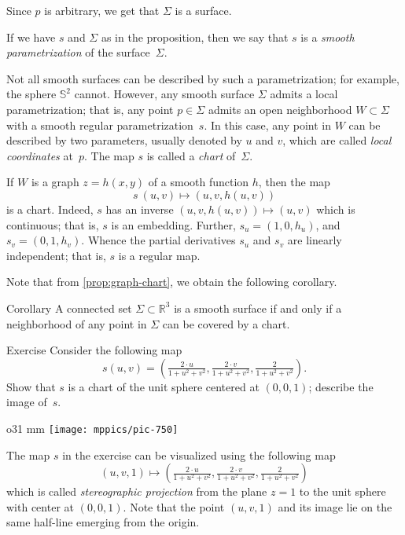 Since $p$ is arbitrary, we get that $\Sigma$ is a surface.
\qeds

If we have $s$ and $\Sigma$ as in the proposition, then we say that $s$ is a \emph{smooth parametrization} of the surface~$\Sigma$. 

Not all smooth surfaces can be described by such a parametrization;
for example, the sphere $\mathbb{S}^2$ cannot.
However, any smooth surface $\Sigma$ admits a local parametrization; that is, any point $p\in\Sigma$ admits an open neighborhood $W\subset \Sigma$ with a smooth regular parametrization~$s$.
In this case, any point in $W$ can be described by two parameters, usually denoted by $u$ and $v$, 
which are called \emph{local coordinates} at~$p$.
The map $s$ is called a \emph{chart} of~$\Sigma$.

If $W$ is a graph $z=h(x,y)$ of a smooth function $h$, then the map 
\[s\:(u,v)\mapsto (u,v,h(u,v))\] is a chart.
Indeed, $s$ has an inverse $(u,v,h(u,v))\mapsto (u,v)$ which is continuous;
that is, $s$ is an embedding.
Further,
$s_u=(1,0,h_u)$, and $s_v=(0,1,h_v)$. 
Whence the partial derivatives $s_u$ and $s_v$ are linearly independent;
that is, $s$ is a regular map.

Note that from \ref{prop:graph-chart}, we obtain the following corollary.

\begin{thm}{Corollary}\label{cor:reg-parmeterization}
A connected set $\Sigma\subset \mathbb{R}^3$ is a smooth surface if and only if a neighborhood of any point in $\Sigma$ can be covered by a chart.
\end{thm}


\begin{thm}{Exercise}\label{ex:inversion-chart}
Consider the following map 
\[s(u,v)=(\tfrac{2\cdot u}{1+u^2+v^2},\tfrac{2\cdot v}{1+u^2+v^2},\tfrac{2}{1+u^2+v^2}).\]
Show that $s$ is a chart of the unit sphere centered at $(0,0,1)$; describe the image of~$s$.
\end{thm}

\begin{wrapfigure}{o}{31 mm}
\vskip-6mm
\centering
\texttt{[image: mppics/pic-750]}
\vskip0mm
\end{wrapfigure}

The map $s$ in the exercise can be visualized using the following map
\[(u,v,1)\mapsto (\tfrac{2\cdot u}{1+u^2+v^2},\tfrac{2\cdot v}{1+u^2+v^2},\tfrac{2}{1+u^2+v^2})\]
which is called \emph{stereographic projection} from the plane $z=1$ to the unit sphere with center at $(0,0,1)$.
Note that the point $(u,v,1)$ and its image lie on the same half-line emerging from the origin. 

